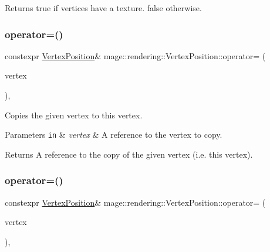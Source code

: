 \begin{DoxyReturn}{Returns}
{\ttfamily true} if vertices have a texture. {\ttfamily false} otherwise. 
\end{DoxyReturn}
\hypertarget{structmage_1_1rendering_1_1_vertex_position_a9b25981be6c9b46f6c8c4dbc0c143fc6}{}\label{structmage_1_1rendering_1_1_vertex_position_a9b25981be6c9b46f6c8c4dbc0c143fc6} 
\subsubsection{\texorpdfstring{operator=()}{operator=()}\hspace{0.1cm}{\footnotesize\ttfamily [1/2]}}
{\footnotesize\ttfamily constexpr \hyperlink{structmage_1_1rendering_1_1_vertex_position}{Vertex\+Position}\& mage\+::rendering\+::\+Vertex\+Position\+::operator= (\begin{DoxyParamCaption}\item[{const \hyperlink{structmage_1_1rendering_1_1_vertex_position}{Vertex\+Position} \&}]{vertex }\end{DoxyParamCaption})\hspace{0.3cm}{\ttfamily [default]}, {\ttfamily [noexcept]}}

Copies the given vertex to this vertex.


\begin{DoxyParams}[1]{Parameters}
\mbox{\tt in}  & {\em vertex} & A reference to the vertex to copy. \\
\hline
\end{DoxyParams}
\begin{DoxyReturn}{Returns}
A reference to the copy of the given vertex (i.\+e. this vertex). 
\end{DoxyReturn}
\hypertarget{structmage_1_1rendering_1_1_vertex_position_a1bb8da5039eae002fbfc446a5a4d8c4a}{}\label{structmage_1_1rendering_1_1_vertex_position_a1bb8da5039eae002fbfc446a5a4d8c4a} 
\subsubsection{\texorpdfstring{operator=()}{operator=()}\hspace{0.1cm}{\footnotesize\ttfamily [2/2]}}
{\footnotesize\ttfamily constexpr \hyperlink{structmage_1_1rendering_1_1_vertex_position}{Vertex\+Position}\& mage\+::rendering\+::\+Vertex\+Position\+::operator= (\begin{DoxyParamCaption}\item[{\hyperlink{structmage_1_1rendering_1_1_vertex_position}{Vertex\+Position} \&\&}]{vertex }\end{DoxyParamCaption})\hspace{0.3cm}{\ttfamily [default]}, {\ttfamily [noexcept]}}

